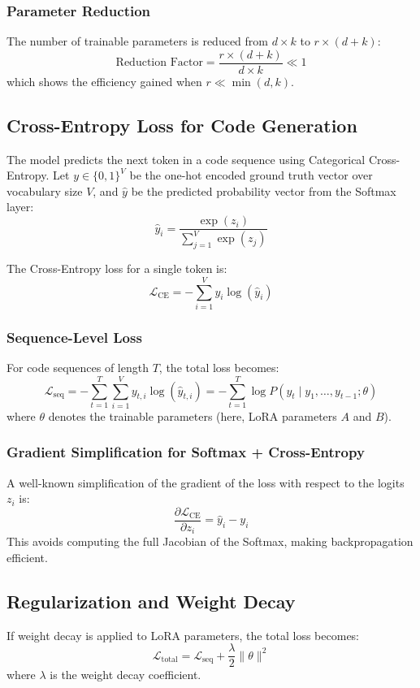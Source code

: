 \subsubsection{Parameter Reduction}
The number of trainable parameters is reduced from $d \times k$ to $r \times (d + k)$:
\[
\text{Reduction Factor} = \frac{r \times (d+k)}{d \times k} \ll 1
\]
which shows the efficiency gained when $r \ll \min(d,k)$.

\subsection{Cross-Entropy Loss for Code Generation}
The model predicts the next token in a code sequence using Categorical Cross-Entropy. Let $y \in \{0,1\}^V$ be the one-hot encoded ground truth vector over vocabulary size $V$, and $\hat{y}$ be the predicted probability vector from the Softmax layer:
\[
\hat{y}_i = \frac{\exp(z_i)}{\sum_{j=1}^{V} \exp(z_j)}
\]

The Cross-Entropy loss for a single token is:
\[
\mathcal{L}_\text{CE} = - \sum_{i=1}^{V} y_i \log(\hat{y}_i)
\]

\subsubsection{Sequence-Level Loss}
For code sequences of length $T$, the total loss becomes:
\[
\mathcal{L}_\text{seq} = - \sum_{t=1}^{T} \sum_{i=1}^{V} y_{t,i} \log(\hat{y}_{t,i}) 
= - \sum_{t=1}^{T} \log P(y_t \mid y_1, \dots, y_{t-1}; \theta)
\]
where $\theta$ denotes the trainable parameters (here, LoRA parameters $A$ and $B$).

\subsubsection{Gradient Simplification for Softmax + Cross-Entropy}
A well-known simplification of the gradient of the loss with respect to the logits $z_i$ is:
\[
\frac{\partial \mathcal{L}_\text{CE}}{\partial z_i} = \hat{y}_i - y_i
\]
This avoids computing the full Jacobian of the Softmax, making backpropagation efficient.


\subsection{Regularization and Weight Decay}
If weight decay is applied to LoRA parameters, the total loss becomes:
\[
\mathcal{L}_\text{total} = \mathcal{L}_\text{seq} + \frac{\lambda}{2} \| \theta \|^2
\]
where $\lambda$ is the weight decay coefficient.

